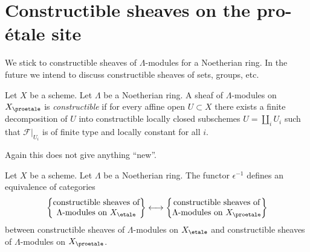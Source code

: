 \section{Constructible sheaves on the pro-\'etale site}
\label{section-constructible}

\noindent
We stick to constructible sheaves of $\Lambda$-modules for a
Noetherian ring. In the future we intend to discuss constructible
sheaves of sets, groups, etc.

\begin{definition}
\label{definition-constructible}
Let $X$ be a scheme.
Let $\Lambda$ be a Noetherian ring. A sheaf of $\Lambda$-modules
on $X_\proetale$ is {\it constructible} if for every affine open
$U \subset X$ there exists a finite decomposition
of $U$ into constructible locally closed subschemes
$U = \coprod_i U_i$ such that
$\mathcal{F}|_{U_i}$ is of finite type and locally constant for all $i$.
\end{definition}

\noindent
Again this does not give anything ``new''.

\begin{lemma}
\label{lemma-compare-constructible}
Let $X$ be a scheme. Let $\Lambda$ be a Noetherian ring.
The functor $\epsilon^{-1}$ defines an equivalence of categories
$$
\left\{
\begin{matrix}
\text{constructible sheaves of}\\
\Lambda\text{-modules on }X_\etale\\
\end{matrix}
\right\}
\longleftrightarrow
\left\{
\begin{matrix}
\text{constructible sheaves of}\\
\Lambda\text{-modules on }X_\proetale\\
\end{matrix}
\right\}
$$
between constructible sheaves of $\Lambda$-modules on $X_\etale$
and constructible sheaves of $\Lambda$-modules on $X_\proetale$.
\end{lemma}

